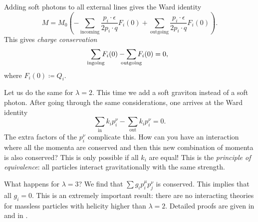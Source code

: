 Adding soft photons to all external lines gives the Ward identity
\begin{equation}
  M = M_0 \left( -\sum_{\text{incoming}} \frac{p_i \cdot \epsilon}{2 p_i \cdot q} F_i(0) + \sum_{\text{outgoing}} \frac{p_i \cdot \epsilon}{2 p_i \cdot q} F_i(0) \right).
\end{equation}
This gives \emph{charge conservation}
\begin{equation}
  \sum_{\mathclap{\text{ingoing}}} F_i (0) - \sum_{\mathclap{\text{outgoing}}} F_i(0) = 0,
\end{equation}
where $F_i(0) \coloneqq Q_i$.

Let us do the same for $\lambda = 2$. This time we add a soft graviton instead of a soft photon.
After going through the same considerations, one arrives at the Ward identity
\begin{equation}
  \sum_{\text{in}} k_i p_i^{\nu} - \sum_{\text{out}} k_i p^{\nu}_i = 0.
\end{equation}
The extra factors of the $p_i^{\nu}$ complicate this.
How can you have an interaction where all the momenta are conserved and then this new combination of momenta is also conserved? This is only possible if all $k_i$ are equal!
This is the \emph{principle of equivalence}: all particles interact gravitationally with the same strength.

What happens for $\lambda = 3$?
We find that $ \sum g_i p_i^{\mu} p_j^{\nu} $ is conserved.
This implies that all $g_i = 0$.
This is an extremely important result: there are no interacting theories for massless particles with helicity higher than $\lambda = 2$.
Detailed proofs are given in \cite[Vol.~1, Chapter 13]{weinberg} and in \cite[Chapter 9]{schwartz}.
